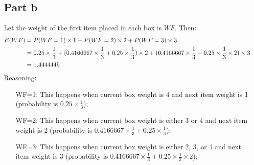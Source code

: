 \documentclass[11pt]{article}
\begin{document}
\subsection*{Part b}
Let the weight of the first item placed in each box is $WF$. Then:
\begin{align*}
E(WF) &= P(WF=1)\times 1 +  P(WF=2)\times 2 + P(WF=3)\times 3 \\
&= 0.25 \times \frac{1}{3} \time 1 + (0.4166667 \times \frac{1}{3} + 0.25 \times \frac{1}{3}) \times 2 + (0.4166667 \times \frac{1}{3} + 0.25 \times \frac{1}{3} \times 2) \times 3 \\
&= 1.4444445
\end{align*}
Reasoning:
\begin{itemize}
\item[WF=1:] This happens when current box weight is 4 and next item weight is 1 (probability is $0.25 \times \frac{1}{3}$);
\item[WF=2:] This happens when current box weight is either 3 or 4 and next item weight is 2 (probability is $0.4166667 \times \frac{1}{3} + 0.25 \times \frac{1}{3}$);
\item[WF=3:] This happens when current box weight is either 2, 3, or 4 and next item weight is 3 (probability is $0.4166667 \times \frac{1}{3} + 0.25 \times \frac{1}{3} \times 2$);
\end{itemize}
\end{document}
